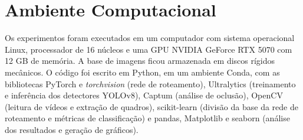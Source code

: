 \section{Ambiente Computacional}
\label{sec:ambiente-computacional}

Os experimentos foram executados em um computador com sistema operacional Linux, processador de 16 núcleos e uma GPU NVIDIA GeForce RTX 5070 com 12 GB de memória. A base de imagens ficou armazenada em discos rígidos mecânicos. O código foi escrito em Python, em um ambiente Conda, com as bibliotecas PyTorch e \textit{torchvision} (rede de roteamento), Ultralytics (treinamento e inferência dos detectores YOLOv8), Captum (análise de oclusão), OpenCV (leitura de vídeos e extração de quadros), scikit-learn (divisão da base da rede de roteamento e métricas de classificação) e pandas, Matplotlib e seaborn (análise dos resultados e geração de gráficos).
